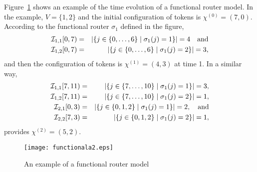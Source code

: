 \documentclass[letter, 11pt]{article}
\newcommand{\1}{\mbox{1}\hspace{-0.25em}\mbox{l}}
\newcommand{\I}{{\cal I}} \newcommand{\C}{{\cal C}} \newcommand{\dtv}{{\cal D}_{\rm tv}}
\begin{document}
Figure~\ref{fig:one} shows an example of the time evolution of a functional router model. 
 In the example, $V=\{1, 2\}$ and the initial configuration of tokens is $\chi^{(0)}=(7, 0)$. 
 According to the functional router $\sigma_1$ defined in the figure, 
\begin{eqnarray*}
  \I_{1, 1}[0, 7) &=& \left|\left\{ j \in \{0, \ldots, 6\} \mid \sigma_1(j)=1 \right\} \right|=4 \quad \mbox{and} \\
  \I_{1, 2}[0, 7) &=& \left|\left\{ j \in \{0, \ldots, 6\} \mid \sigma_1(j)=2 \right\} \right|=3, 
\end{eqnarray*}
and then the configuration of tokens is $\chi^{(1)}=(4, 3)$ at time 1.  
 In a similar way, 
\begin{eqnarray*}
  \I_{1, 1}[7, 11) &=& \left|\left\{ j \in \{7, \ldots, 10\} \mid \sigma_1(j)=1 \right\} \right|=3, \\
  \I_{1, 2}[7, 11) &=& \left|\left\{ j \in \{7, \ldots, 10\} \mid \sigma_1(j)=2 \right\} \right|=1, \\
  \I_{2, 1}[0, 3) &=& \left|\left\{ j \in \{ 0,1,2 \} \mid \sigma_1(j)=1 \right\} \right|=2, \quad \mbox{and} \\
  \I_{2, 2}[7, 3) &=& \left|\left\{ j \in \{ 0,1,2 \} \mid \sigma_1(j)=2 \right\} \right|=1, 
\end{eqnarray*}
  provides $\chi^{(2)}=(5, 2)$. 
\begin{figure}[t]
 \begin{center}
  \texttt{[image: functionala2.eps]}
 \end{center}
 \caption{An example of a functional router model}
 \label{fig:one}
\end{figure}
\end{document}
